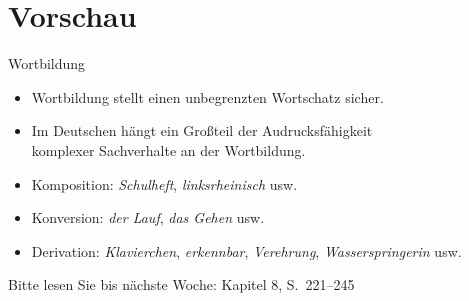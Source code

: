 \section{Vorschau}

\begin{frame}
  {Wortbildung}
  \pause
  \begin{itemize}[<+->]
    \item Wortbildung stellt einen unbegrenzten Wortschatz sicher.
    \item Im Deutschen hängt ein Großteil der Audrucksfähigkeit\\
      komplexer Sachverhalte an der Wortbildung.
      \Zeile
    \item Komposition: \textit{Schulheft}, \textit{linksrheinisch} usw.
    \item Konversion: \textit{der Lauf}, \textit{das Gehen} usw.
    \item Derivation: \textit{Klavierchen}, \textit{erkennbar}, \textit{Verehrung}, \textit{Wasserspringerin} usw.
  \end{itemize}
  \pause
  \begin{center}
    Bitte lesen Sie bis nächste Woche: \alert{Kapitel 8, S.~221--245}
  \end{center}
\end{frame}

